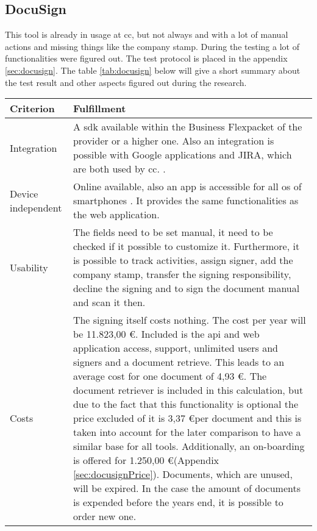 \subsection{DocuSign}
This tool is already in usage at \gls{cc}, but not always and with a lot of manual actions and missing things like the company stamp. During the testing a lot of functionalities were figured out. The test protocol is placed in the appendix \ref{sec:docusign}. The table \ref{tab:docusign} below will give a short summary about the test result and other aspects figured out during the research.

	
	\begin{longtable}{|p{4cm}|p{10cm}|} \hline
		Criterion & Fulfillment \\ \hline
		Integration &  A \gls{sdk} available within the \grqq Business Flex\grqq packet of the provider or a higher one. Also an integration is possible with Google applications and JIRA, which are both used by \gls{cc}. \parencite{docusign2018integration,docusign2018formats,docusign2018google,docusign2018jira}. \\ \hline
		Device independent & Online available, also an \gls{app} is accessible for all \gls{os} of smartphones \parencite{docusign2018mobile}. It provides the same functionalities as the web application. \\ \hline
		Usability &  The fields need to be set manual, it need to be checked if it possible to customize it. Furthermore, it is possible to track activities, assign signer, add the company stamp, transfer the signing responsibility, decline the signing and to sign the document manual and scan it then. \\ \hline
		Costs & The signing itself costs nothing. The cost per year will be 11.823,00 \euro. Included is the \gls{api} and web application access, support, unlimited users and signers and a document retrieve. This leads to an average cost for one document of 4,93 \euro. The document retriever is included in this calculation, but due to the fact that this functionality is optional the price excluded of it is 3,37 \euro per document and this is taken into account for the later comparison to have a similar base for all tools. Additionally, an on-boarding is offered for 1.250,00 \euro (Appendix \ref{sec:docusignPrice}). Documents, which are unused, will be expired. In the case the amount of documents is expended before the years end, it is possible to order new one. \\ \hline

\end{longtable}
